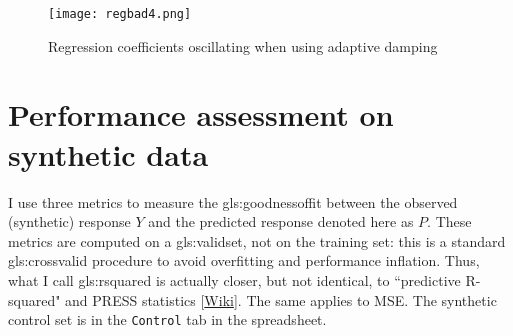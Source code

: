 \documentclass[oneside,10pt]{book}
\begin{document}
\begin{figure}%
\centering
\texttt{[image: regbad4.png]}
\caption{Regression coefficients oscillating when using adaptive damping}
\label{fig:regdash}
\end{figure}


\section{Performance assessment on synthetic data}\label{pasr}


I use three metrics to measure the  \gls{gls:goodnessoffit} between the observed (synthetic) response $Y$ and the predicted response denoted here as $P$. These metrics are computed on a \gls{gls:validset}, 
not on the training set: this is a standard \gls{gls:crossvalid} procedure to avoid overfitting and performance inflation. Thus, what I call \gls{gls:rsquared} is actually closer, but not identical,  to 
``predictive R-squared" and PRESS statistics [\href{https://en.wikipedia.org/wiki/PRESS_statistic}{Wiki}]. The same applies to MSE.
The synthetic control set is in the \texttt{Control} tab in the spreadsheet. 
\end{document}

